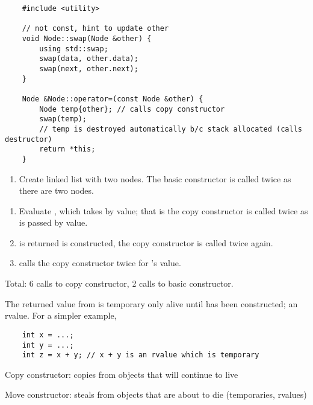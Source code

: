 \begin{lstlisting}
    #include <utility>

    // not const, hint to update other
    void Node::swap(Node &other) {
        using std::swap;
        swap(data, other.data);
        swap(next, other.next);
    }

    Node &Node::operator=(const Node &other) {
        Node temp{other}; // calls copy constructor
        swap(temp);
        // temp is destroyed automatically b/c stack allocated (calls destructor)
        return *this;
    }
\end{lstlisting}



 

\begin{enumerate}[(1)]
    \item Create linked list with two nodes. The basic constructor is called twice
    as there are two nodes.
\end{enumerate}

\begin{enumerate}[(1)]
    \item Evaluate , which takes  by value; that is
    the copy constructor is called twice as  is passed by value.
    \item {} is returned  is constructed, the copy constructor
    is called twice again.
    \item {} calls the copy constructor twice for 's value.
\end{enumerate}

Total: 6 calls to copy constructor, 2 calls to basic constructor.

The returned value from  is temporary only alive until 
has been constructed; an rvalue. For a simpler example,
\begin{lstlisting}
    int x = ...;
    int y = ...;
    int z = x + y; // x + y is an rvalue which is temporary
\end{lstlisting}

Copy constructor: copies from objects that will continue to live

Move constructor: steals from objects that are about to die (temporaries, rvalues)

